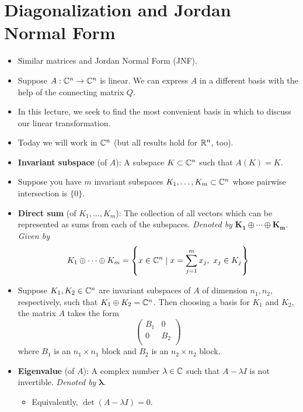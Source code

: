 \documentclass[../notes.tex]{subfiles}
\begin{document}
\section{Diagonalization and Jordan Normal Form}
\begin{itemize}
    \item {}Similar matrices and Jordan Normal Form (JNF).
    \item Suppose $A:\mathbb{C}^n\to\mathbb{C}^n$ is linear. We can express $A$ in a different basis with the help of the connecting matrix $Q$.
    \item In this lecture, we seek to find the most convenient basis in which to discuss our linear transformation.
    \item Today we will work in $\mathbb{C}^n$ (but all results hold for $\mathbb{R}^n$, too).
    \item \textbf{Invariant subspace} (of $A$): A subspace $K\subset\mathbb{C}^n$ such that $A(K)=K$.
    \item Suppose you have $m$ invariant subspaces $K_1,\dots,K_m\subset\mathbb{C}^n$ whose pairwise intersection is $\{0\}$.
    \item \textbf{Direct sum} (of $K_1,\dots,K_m$): The collection of all vectors which can be represented as sums from each of the subspaces. \emph{Denoted by} $\bm{K_1\oplus\cdots\oplus K_m}$. \emph{Given by}
    \begin{equation*}
        K_1\oplus\cdots\oplus K_m = \left\{ x\in\mathbb{C}^n\mid x=\sum_{j=1}^mx_j,\ x_j\in K_j \right\}
    \end{equation*}
    \item Suppose $K_1,K_2\in\mathbb{C}^n$ are invariant subspaces of $A$ of dimension $n_1,n_2$, respectively, such that $K_1\oplus K_2=\mathbb{C}^n$. Then choosing a basis for $K_1$ and $K_2$, the matrix $A$ takes the form
    \begin{equation*}
        \begin{pmatrix}
            B_1 & 0\\
            0 & B_2\\
        \end{pmatrix}
    \end{equation*}
    where $B_1$ is an $n_1\times n_1$ block and $B_2$ is an $n_2\times n_2$ block.
    \item \textbf{Eigenvalue} (of $A$): A complex number $\lambda\in\mathbb{C}$ such that $A-\lambda I$ is not invertible. \emph{Denoted by} $\bm{\lambda}$.
    \begin{itemize}
        \item Equivalently, $\det(A-\lambda I)=0$.

\end{itemize}
\end{itemize}
\end{document}
